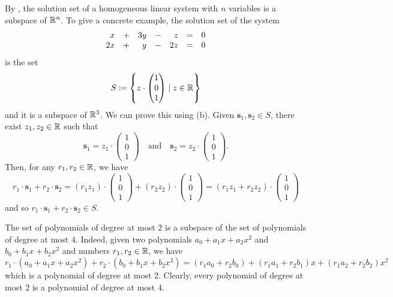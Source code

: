 \begin{example}{}{}
 By , the
 solution set of a homogeneous linear system with $n$ variables is a subspace of
 $\mathbb{R}^{n}$. To give a concrete example, the solution set of the system
 \[
  \begin{array}{r c r c r c r}
   x & + & 3y & - & z & = & 0\\
   2x & + & y & - & 2z & = & 0
  \end{array}
 \]
 is the set
 \[
  S \coloneqq \left\{ z \cdot 
   \begin{pmatrix}
    1\\
    0\\
    1
   \end{pmatrix} \mid z \in \mathbb{R}
  \right\}
 \]
 and it is a subspace of $\mathbb{R}^3$. We can prove this using
  (b). Given
 $\mathbf{s}_1,\mathbf{s}_2 \in S$, there exist $z_1,z_2 \in \mathbb{R}$ such that
 \[
  \mathbf{s}_1 = z_1 \cdot 
  \begin{pmatrix}
   1\\
   0\\
   1
  \end{pmatrix} \quad \text{and} \quad 
  \mathbf{s}_2 = z_2 \cdot 
  \begin{pmatrix}
   1\\
   0\\
   1
  \end{pmatrix}.
 \]
 Then, for any $r_1,r_2 \in \mathbb{R}$, we have
 \[
  r_1 \cdot \mathbf{s}_1 + r_2 \cdot \mathbf{s}_2 = (r_1z_1) \cdot 
  \begin{pmatrix}
   1\\
   0\\
   1
  \end{pmatrix}
  + (r_2z_2) \cdot 
  \begin{pmatrix}
   1\\
   0\\
   1
  \end{pmatrix}
  = (r_1z_1 + r_2z_2) \cdot 
  \begin{pmatrix}
   1\\
   0\\
   1
  \end{pmatrix}
 \]
 and so $r_1 \cdot \mathbf{s}_1 + r_2 \cdot \mathbf{s}_2 \in S$. 
\end{example}

\begin{example}{}{}
 The set of polynomials of degree at most $2$ is a subspace of the set of
 polynomials of degree at most $4$. Indeed, given two polynomials $a_0 + a_1x +
 a_2x^2$ and $b_0 + b_1x + b_2x^2$ and numbers $r_1,r_2 \in \mathbb{R}$, we have
 \[
  r_1 \cdot (a_0 + a_1x + a_2x^2) + r_2 \cdot (b_0 + b_1x + b_2x^2) = (r_1a_0 +
  r_2b_0) + (r_1a_1 + r_2b_1)x + (r_1a_2 + r_2b_2)x^2
 \]
 which is a polynomial of degree at most $2$. Clearly, every polynomial of
 degree at most $2$ is a polynomial of degree at most $4$.
\end{example}

